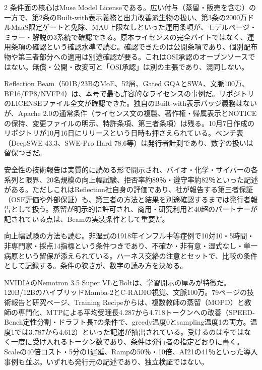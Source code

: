 \documentclass[lualatex,a4paper,10pt]{jlreq}
\begin{document}
\begin{multicols}{2}
条件面の核心はMuse Model Licenseである。広い付与（蒸留・販売を含む）の一方で、第2条のBuilt-with表示義務と出力改善派生物の扱い、第3条の2000万ドルMaaS限定ゲートと免除、MAU上限なしといった運用条項が、モデルページ・ミラー・解説の3系統で確認できる。原本ライセンスの完全バイトではなく、運用条項の確認という確認水準で読む。確認できたのは公開条項であり、個別配布物や第三者部分への適用は別途確認が要る。これはOSI承認のオープンソースではない。無償・公開・改変可と「OSI承認」は別の主張であり、混同しない。
\cite{B14,B70,B15,B13,B71}


Reflection Beam（501B/23BのMoE、52層、Gated GQAとSWA、文脈100万、BF16/FP8/NVFP4）は、本号で最も許容的なライセンスの事例だ。リポジトリのLICENSEファイル全文が確認できた。独自のBuilt-with表示バッジ義務はないが、Apache 2.0の通常条件（ライセンス文の複製、著作権・帰属表示とNOTICEの保持、変更ファイルの明示、特許条項、第三者条項）は残る。10月7日作成のリポジトリが10月16日にリリースという日時も押さえられている。ベンチ表（DeepSWE 43.3、SWE-Pro Hard 78.6等）は発行者計測であり、数字の扱いは留保つきだ。
\cite{B17,B19,B18,B16}


安全性の技術報告は実質的に読める形で開示され、バイオ・化学・サイバーの各系列と限界、20名規模の向上幅試験、拒否率約89％・遵守率約82％といった記述がある。ただしこれはReflection社自身の評価であり、社が報告する第三者保証（OSF評価や外部保証）も、第三者の方法と結果を別途確認するまでは発行者報告として扱う。蒸留が明示的に許可され、商用・研究利用と40超のパートナーが記されている点は、Beamの実装条件として重要だ。
\cite{B17,B19,B18,B16}


向上幅試験の方法も読む。非湿式の1918年インフル中等症例で10対10・5時間・非専門家・採点14指標という条件つきであり、不確か・非有意・湿式なし・単一病原という留保が添えられている。ハーネス交絡の注意とセットで、比較の条件として記録する。条件の狭さが、数字の読み方を決める。
\cite{B17,B19,B18,B16}


NVIDIAのNemotron 3.5 Super VLとBoltは、学習開示の厚みが特徴だ。120B/12BのハイブリッドMamba-2とC-RADIO視覚、文脈100万。79ページの技術報告と研究ページ、Training Recipeからは、複数教師の蒸留（MOPD）と教師の専門化、MTPによる平均受理長4.287から4.718トークンへの改善（SPEED-Bench定性分割・ドラフト長7の条件で、greedy温度0とsampling温度1の両方。温度1では3.787から4.612）といった記述が抽出されている。受けるのは率ではなく一度に受け入れるトークン数であり、条件は発行者の指定どおりに書く。Scaleの40倍コスト・5分の1遅延、Rampの50％・10倍、AI21の41％といった導入事例も並ぶ。いずれも発行元の記述であり、独立検証ではない。
\cite{B21,B72,B22,B20,B60}



\end{multicols}
\end{document}
